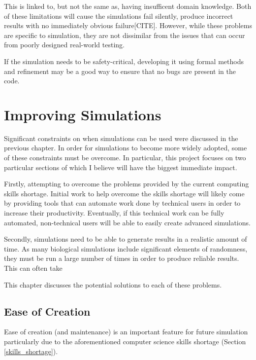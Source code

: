 \documentclass{UoYCSproject}
\begin{document}
This is linked to, but not the same as, having insufficent domain knowledge. Both of these limitations will cause the simulations fail silently, produce incorrect results with no immediately obvious failure[CITE]. However, while these problems are specific to simulation, they are not dissimilar from the issues that can occur from poorly designed real-world testing. %

If the simulation needs to be safety-critical, developing it using formal methods and refinement may be a good way to ensure that no bugs are present in the code.

\section{Improving Simulations}
\label{improvements}
Significant constraints on when simulations can be used were discussed in the previous chapter. In order for simulations to become more widely adopted, some of these constraints must be overcome. 
In particular, this project focuses on two particular sections of which I believe will have the biggest immediate impact.

Firstly, attempting to overcome the problems provided by the current computing skills shortage. 
Initial work to help overcome the skills shortage will likely come by providing tools that can automate work done by technical users in order to increase their productivity.
Eventually, if this technical work can be fully automated, non-technical users will be able to easily create advanced simulations.

Secondly, simulations need to be able to generate results in a realistic amount of time. As many biological simulations include significant elements of randomness, they must be run a large number of times in order to produce reliable results. This can often take 

This chapter discusses the potential solutions to each of these problems.

\subsection{Ease of Creation}
Ease of creation (and maintenance) is an important feature for future simulation particularly due to the aforementioned computer science skills shortage (Section \ref{skills_shortage}).
\end{document}
